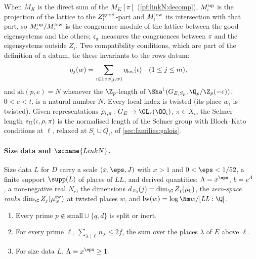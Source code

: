 When $M_K$ is the direct sum of the $M_K[\pi]$ (\cref{pf:linkN:decomp}), $M^{\mathrm{up}}_\iota$ is the projection of the lattice
to the $Z^{\mathrm{good}}_\iota$-part and $M^{\mathrm{low}}_\iota$ its intersection with that part, so $M^{\mathrm{up}}_\iota/M^{\mathrm{low}}_\iota$ is
the congruence module of the lattice between the good eigensystems and the others; $\mathfrak c_\pi$ measures the
congruences between $\pi$ and the eigensystems outside $Z_\iota$. Two compatibility conditions, which are part of the
definition of a datum, tie these invariants to the rows datum:
\begin{equation}\label{eq:pf:linkN:ties}
\eta_j(w)=\sum_{\iota\in\mathrm{Loc}(j,w)}\eta_{\mathrm{loc}}(\iota)\quad(1\le j\le m),
\end{equation}
and $\mathrm{sh}(p,e)=N$ whenever the $\Z_p$-length of $\Sha^1(G_{E,S_p},\Q_p/\Z_p(-e))$, $0<e<t$, is a natural number
$N$. Every local index is twisted (its place $w_\iota$ is twisted). Given representations
$\rho_{\iota,\pi}:G_E\to\GL_r(\OO_\iota)$, $\pi\in X_\iota$, the Selmer length $s_\Pi(\iota,\rho,\pi)$ is the normalised
length of the Selmer group with Bloch--Kato conditions at $\ell$, relaxed at $S_\iota\cup Q_\iota$, of
\cref{sec:families:galois}.

\paragraph{Size data and $\sfname{LinkN}$.}
Size data $L$ for $D$ carry a scale $(x,\eps,J)$ with $x>1$ and $0<\eps<1/52$, a finite support $\supp(L)$ of places of
$\mathit{LL}$, and derived quantities: $\Lambda=x^{\eps}$, $b=e^{\Lambda}$, a non-negative real $N_c$, the dimensions
$\linkNdZ(j)=\dim_\C Z_j(\mu_0)$, the \emph{zero-space ranks} $\dim_\C Z_j(\mu^{\mathrm{tw}}_w)$ at twisted places $w$, and
$\linkNlw(w)=\log\Nm w/[\mathit{LL}:\Q]$.

\begin{lemma}\label{pf:linkN:hostsize}
\begin{enumerate}[label=(\roman*)]
\item Every prime $p\notin\mathrm{small}\cup\{q,d\}$ is split or inert.
\item For every prime $\ell$, $\sum_{\lambda\mid\ell}n_\lambda\le2f$, the sum over the places $\lambda$ of $E$ above $\ell$.
\item For size data $L$, $\Lambda=x^\eps\ge1$.
\end{enumerate}
\end{lemma}

